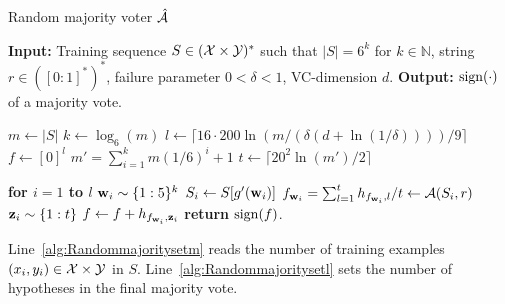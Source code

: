 \begin{algorithm}[H]
    \caption{Random majority voter $\mathcal{\hat{A}}$}\label{alg:Randommajority}
    \begin{algorithmic}[1]
        \State \textbf{Input:} Training sequence $S \in (\mathcal{X} \times \mathcal{Y})^{*}$ such that $|S|=6^{k}$ for $k \in \mathbb{N}$, string $r \in ([0:1]^{*})^{*}$, failure parameter $0<\delta<1$, VC-dimension $d.$
        \State \textbf{Output:} $ \operatorname{sign}(\cdot) $ of a majority vote.
        
        \State $m \gets |S|$ \label{alg:Randommajoritysetm}
        \State $k \gets \log_{6}(m)$ \label{alg:Randommajoritysetk}
        \State $l \gets \lceil 16 \cdot 200 \ln{(m/(\delta(d + \ln{\left(1/\delta \right)})))}/9\rceil$ \label{alg:Randommajoritysetl}
        \State $f \gets [0]^{l}$ \label{alg:Randommajoritysetf}
        \State $m'=\sum_{i=1}^{k} m(1/6)^{i}+1$\label{alg:Randommajoritysetsubtraingsequencesamplesize}
        \State $t \gets \lceil 20^{2} \ln{(m')}/2\rceil$ \label{alg:Randommajoritysett}

        \State \textbf{for $i = 1$ \textbf{to} $l$} \label{alg:Randommajorityforloopstart} 
        \State\hspace{0.5cm}\vline\hspace{0.1cm}$\mathbf{w}_{i} \sim \{1:5\}^{k}$ \label{alg:RandommajoritysamplingS}
        \State\hspace{0.5cm}\vline\hspace{0.1cm}$S_{i} \gets S[g'(\mathbf{w}_{i})]$ \label{alg:Randommajoritysamplingefficient}
        \State\hspace{0.5cm}\vline\hspace{0.1cm}$f_{\mathbf{w}_{i}}=\sum_{l=1}^{t}h_{f_{\mathbf{w}_{i}},l}/t \gets \mathcal{A}(S_{i}, r)$ \label{alg:Randommajorityrunsadaboostsample}
        \State\hspace{0.5cm}\vline\hspace{0.1cm}$\mathbf{z}_{i} \sim \{1:t\}$ \label{alg:Randommajoritysamplingindex1}
        \State\hspace{0.5cm}\vline\hspace{0.1cm}$f \gets f + h_{f_{\mathbf{w}_{i}}, \mathbf{z}_{i}}$ \label{alg:Randommajorityaddshypothesis}
        \State \textbf{return }{$\operatorname{sign}(f)$.} \label{alg:Randommajorityoutputofhat}
    \end{algorithmic}
\end{algorithm}
Line~\ref{alg:Randommajoritysetm} reads the number of training examples $(x_i,y_i)\in\mathcal{X}\times  \mathcal{Y}$ in $S.$
Line~\ref{alg:Randommajoritysetl} sets the number of hypotheses in the final majority vote.

